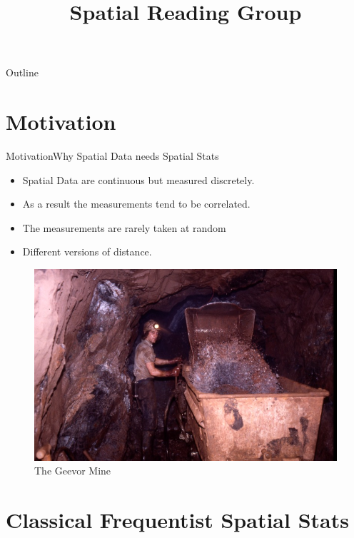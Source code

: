 \documentclass{beamer}
\title{Spatial Reading Group}
\begin{document}
\begin{frame}
  \titlepage
\end{frame}

\begin{frame}{Outline}
  \tableofcontents
\end{frame}

\section{Motivation}


\begin{frame}{Motivation}{Why Spatial Data needs Spatial Stats}
  \begin{itemize}
  	\item {
   		Spatial Data are continuous but measured discretely.
 	}
    \item {
 		As a result the measurements tend to be correlated.
 	}
 	\item {
  		The measurements are rarely taken at random
  	}
    \item{
    	Different versions of distance.
    }
	\end{itemize}
	\begin{figure}
	\centering
		\includegraphics[scale = 0.8]{Images/Geevor_Tin.jpg}
		\caption{ { \scriptsize The Geevor Mine}}
	\end{figure}    
\end{frame}


\section{Classical Frequentist Spatial Stats}
\end{document}
